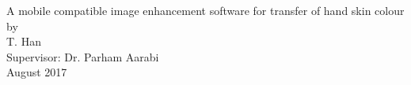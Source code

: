 \documentclass[12pt,a4paper]{report}
\begin{document}
\begin{titlepage}
	\centering
	\vspace{1.5cm}
	\huge A mobile compatible image enhancement software for transfer of hand skin colour\\
	\vspace{3cm}
	\large by\\
	\vspace{1cm}
	\large T. Han\\
	\vspace{1cm}
	\large Supervisor: Dr. Parham Aarabi\\
	\large August 2017\\
	\vfill
	
\end{titlepage}
\end{document}
